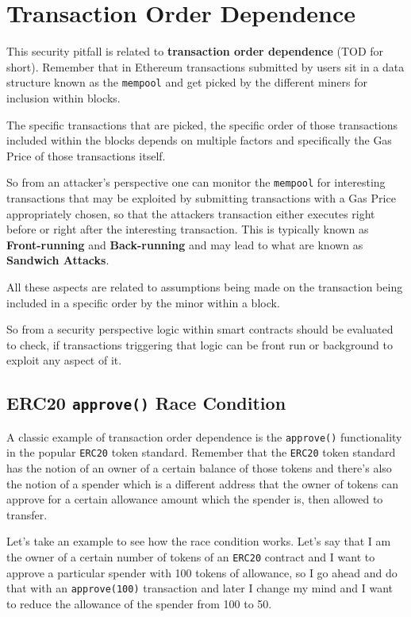 \section{Transaction Order
Dependence}\label{transaction-order-dependence}

This security pitfall is related to \textbf{transaction order
dependence} (TOD for short). Remember that in Ethereum transactions
submitted by users sit in a data structure known as the \texttt{mempool}
and get picked by the different miners for inclusion within blocks.

The specific transactions that are picked, the specific order of those
transactions included within the blocks depends on multiple factors and
specifically the Gas Price of those transactions itself.

So from an attacker's perspective one can monitor the \texttt{mempool}
for interesting transactions that may be exploited by submitting
transactions with a Gas Price appropriately chosen, so that the
attackers transaction either executes right before or right after the
interesting transaction. This is typically known as
\textbf{Front-running} and \textbf{Back-running} and may lead to what
are known as \textbf{Sandwich Attacks}.

All these aspects are related to assumptions being made on the
transaction being included in a specific order by the minor within a
block.

So from a security perspective logic within smart contracts should be
evaluated to check, if transactions triggering that logic can be front
run or background to exploit any aspect of it.

\subsection{\texorpdfstring{ERC20 \texttt{approve()} Race
Condition}{ERC20 approve() Race Condition}}\label{erc20-approve-race-condition}

A classic example of transaction order dependence is the
\texttt{approve()} functionality in the popular \texttt{ERC20} token
standard. Remember that the \texttt{ERC20} token standard has the notion
of an owner of a certain balance of those tokens and there's also the
notion of a spender which is a different address that the owner of
tokens can approve for a certain allowance amount which the spender is,
then allowed to transfer.

Let's take an example to see how the race condition works. Let's say
that I am the owner of a certain number of tokens of an \texttt{ERC20}
contract and I want to approve a particular spender with 100 tokens of
allowance, so I go ahead and do that with an \texttt{approve(100)}
transaction and later I change my mind and I want to reduce the
allowance of the spender from 100 to 50.

